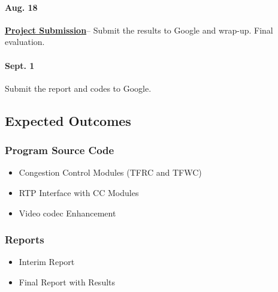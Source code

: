 \paragraph{\textsf{Aug. 18}} \underline{\textbf{Project Submission}}-- Submit
the results to Google and wrap-up. Final evaluation. 

\paragraph{\textsf{Sept. 1}} Submit the report and codes to Google.


\subsection{\label{ssec:outcomes}Expected Outcomes}

\subsubsection{\label{sssec:codes}Program Source Code}

\begin{itemize} 
\item Congestion Control Modules (TFRC and TFWC) 
\item RTP Interface with CC Modules 
\item Video codec Enhancement 
\end{itemize}

\subsubsection{\label{sssec:docs}Reports}

\begin{itemize}
\item Interim Report
\item Final Report with Results
\end{itemize}

\newpage
